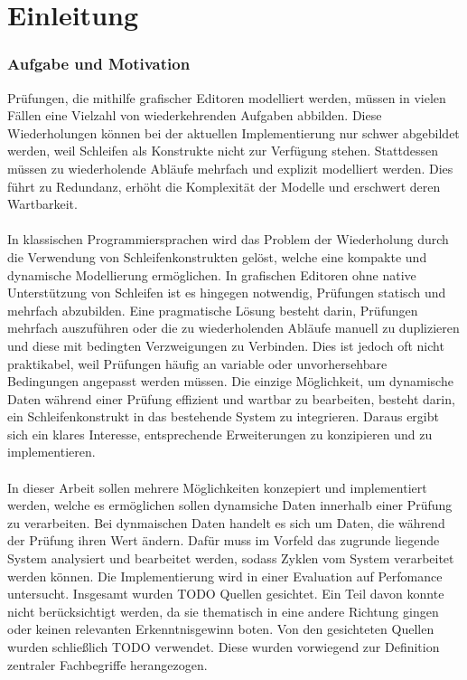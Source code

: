 
    \newpage
    \chapter{Einleitung}
    \subsection{Aufgabe und Motivation}
    Prüfungen, die mithilfe grafischer Editoren modelliert werden, müssen in vielen Fällen eine Vielzahl von wiederkehrenden Aufgaben abbilden. 
    Diese Wiederholungen können bei der aktuellen Implementierung nur schwer abgebildet werden, weil Schleifen als Konstrukte nicht zur Verfügung stehen. 
    Stattdessen müssen zu wiederholende Abläufe mehrfach und explizit modelliert werden. 
    Dies führt zu Redundanz, erhöht die Komplexität der Modelle und erschwert deren Wartbarkeit.\\
    \\
    In klassischen Programmiersprachen wird das Problem der Wiederholung durch die Verwendung von Schleifenkonstrukten gelöst, welche eine kompakte und dynamische Modellierung ermöglichen. 
    In grafischen Editoren ohne native Unterstützung von Schleifen ist es hingegen notwendig, Prüfungen statisch und mehrfach abzubilden. 
    Eine pragmatische Lösung besteht darin, Prüfungen mehrfach auszuführen oder die zu wiederholenden Abläufe manuell zu duplizieren und diese mit bedingten Verzweigungen zu Verbinden. 
    Dies ist jedoch oft nicht praktikabel, weil Prüfungen häufig an variable oder unvorhersehbare Bedingungen angepasst werden müssen.
    Die einzige Möglichkeit, um dynamische Daten während einer Prüfung effizient und wartbar zu bearbeiten, besteht darin, ein Schleifenkonstrukt in das bestehende System zu integrieren. 
    Daraus ergibt sich ein klares Interesse, entsprechende Erweiterungen zu konzipieren und zu implementieren.\\
    \\
    In dieser Arbeit sollen mehrere Möglichkeiten konzepiert und implementiert werden, welche es ermöglichen sollen dynamsiche Daten innerhalb einer Prüfung zu verarbeiten.
    Bei dynmaischen Daten handelt es sich um Daten, die während der Prüfung ihren Wert ändern.
    Dafür muss im Vorfeld das zugrunde liegende System analysiert und bearbeitet werden, sodass Zyklen vom System verarbeitet werden können.
    Die Implementierung wird in einer Evaluation auf Perfomance untersucht.
    Insgesamt wurden TODO Quellen gesichtet. 
    Ein Teil davon konnte nicht berücksichtigt werden, da sie thematisch in eine andere Richtung gingen oder keinen relevanten Erkenntnisgewinn boten. 
    Von den gesichteten Quellen wurden schließlich TODO verwendet. 
    Diese wurden vorwiegend zur Definition zentraler Fachbegriffe herangezogen.
